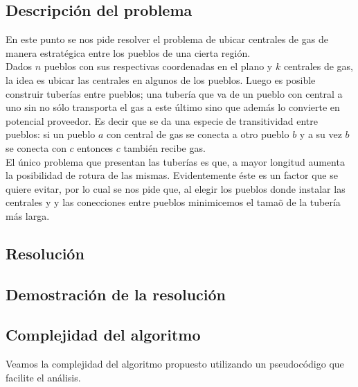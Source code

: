 \subsection{Descripci\'on del problema}

En este punto se nos pide resolver el problema de ubicar centrales de gas de manera estrat\'egica entre los pueblos de una cierta regi\'on.\\

Dados $n$ pueblos con sus respectivas coordenadas en el plano y $k$ centrales de gas, la idea es ubicar las centrales en algunos de los pueblos. Luego es posible construir tuber\'ias entre pueblos; una tuber\'ia que va de un pueblo con central a uno sin no s\'olo transporta el gas a este \'ultimo sino que adem\'as lo convierte en potencial proveedor. Es decir que se da una especie de transitividad entre pueblos: si un pueblo $a$ con central de gas se conecta a otro pueblo $b$ y a su vez $b$ se conecta con $c$ entonces $c$ tambi\'en recibe gas.\\

El \'unico problema que presentan las tuber\'ias es que, a mayor longitud aumenta la posibilidad de rotura de las mismas. Evidentemente \'este es un factor que se quiere evitar, por lo cual se nos pide que, al elegir los pueblos donde instalar las centrales y y las conecciones entre pueblos minimicemos el tama\~o de la tuber\'ia m\'as larga.\\

\subsection{Resoluci\'on}

\subsection{Demostraci\'on de la resoluci\'on}

\subsection{Complejidad del algoritmo}

Veamos la complejidad del algoritmo propuesto utilizando un pseudoc\'odigo que facilite el an\'alisis.\\

